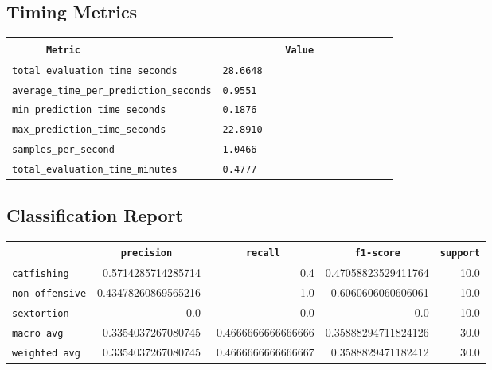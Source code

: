 \documentclass{article}
\begin{document}
\subsection{Timing Metrics}

\begin{center}
\begin{tabular}{l | l} \hline
    \verb|      Metric     | & \verb|           Value           | \\ \hline
    \hline
    \verb|total_evaluation_time_seconds| & \verb|28.6648                      | \\ \hline
    \verb|average_time_per_prediction_seconds| & \verb|0.9551                       | \\ \hline
    \verb|min_prediction_time_seconds| & \verb|0.1876                       | \\ \hline
    \verb|max_prediction_time_seconds| & \verb|22.8910                      | \\ \hline
    \verb|samples_per_second| & \verb|1.0466                       | \\ \hline
    \verb|total_evaluation_time_minutes| & \verb|0.4777                       | \\ \hline
\end{tabular}
\end{center}

\subsection{Classification Report}

\begin{center}
\begin{tabular}{l | r | r | r | r} \hline
    \verb|            | & \verb|    precision     | & \verb|      recall      | & \verb|     f1-score     | & \verb|support| \\ \hline
    \hline
    \verb|catfishing | & 0.5714285714285714 & 0.4 & 0.47058823529411764 &    10.0 \\ \hline
    \verb|non-offensive| & 0.43478260869565216 & 1.0 & 0.6060606060606061 &    10.0 \\ \hline
    \verb|sextortion | & 0.0 & 0.0 & 0.0 &    10.0 \\ \hline
    \verb|macro avg  | & 0.3354037267080745 & 0.4666666666666666 & 0.35888294711824126 &    30.0 \\ \hline
    \verb|weighted avg| & 0.3354037267080745 & 0.4666666666666667 & 0.3588829471182412 &    30.0 \\ \hline
\end{tabular}
\end{center}
\end{document}
